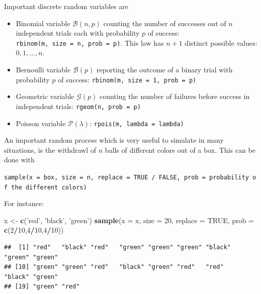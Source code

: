 \documentclass[]{book}
\newenvironment{Shaded}{\begin{snugshade}}{\end{snugshade}}
\newcommand{\DataTypeTok}[1]{\textcolor[rgb]{0.13,0.29,0.53}{#1}}
\newcommand{\DecValTok}[1]{\textcolor[rgb]{0.00,0.00,0.81}{#1}}
\newcommand{\KeywordTok}[1]{\textcolor[rgb]{0.13,0.29,0.53}{\textbf{#1}}}
\newcommand{\NormalTok}[1]{#1}
\newcommand{\OperatorTok}[1]{\textcolor[rgb]{0.81,0.36,0.00}{\textbf{#1}}}
\newcommand{\OtherTok}[1]{\textcolor[rgb]{0.56,0.35,0.01}{#1}}
\newcommand{\StringTok}[1]{\textcolor[rgb]{0.31,0.60,0.02}{#1}}
\providecommand{\tightlist}{%
  \setlength{\itemsep}{0pt}\setlength{\parskip}{0pt}}
\begin{document}
Important discrete random variables are

\begin{itemize}
\tightlist
\item
  Binomial variable \(\mathcal{B}(n, p)\) counting the number of successes out of \(n\) independent trials each with probability \(p\) of success: \texttt{rbinom(m,\ size\ =\ n,\ prob\ =\ p)}. This law has \(n + 1\) distinct possible values: \(0,1,\ldots, n\).
\item
  Bernoulli variable \(\mathcal{B}(p)\) reporting the outcome of a binary trial with probability \(p\) of success: \texttt{rbinom(m,\ size\ =\ 1,\ prob\ =\ p)}
\item
  Geometric variable \(\mathcal{G}(p)\) counting the number of failures before success in independent trials: \texttt{rgeom(n,\ prob\ =\ p)}
\item
  Poisson variable \(\mathcal{P}(\lambda)\): \texttt{rpois(m,\ lambda\ =\ lambda)}
\end{itemize}

An important random process which is very useful to simulate in many situations, is the withdrawl of \(n\) balls of different colors out of a box. This can be done with

\texttt{sample(x\ =\ box,\ size\ =\ n,\ replace\ =\ TRUE\ /\ FALSE,\ prob\ =\ probability\ of\ the\ different\ colors)}

For instance:

\begin{Shaded}
\begin{Highlighting}[]
\NormalTok{x <-}\StringTok{ }\KeywordTok{c}\NormalTok{(}\StringTok{'red'}\NormalTok{, }\StringTok{'black'}\NormalTok{, }\StringTok{'green'}\NormalTok{)}
\KeywordTok{sample}\NormalTok{(}\DataTypeTok{x =}\NormalTok{ x, }\DataTypeTok{size =} \DecValTok{20}\NormalTok{, }\DataTypeTok{replace =} \OtherTok{TRUE}\NormalTok{, }\DataTypeTok{prob =} \KeywordTok{c}\NormalTok{(}\DecValTok{2}\OperatorTok{/}\DecValTok{10}\NormalTok{,}\DecValTok{4}\OperatorTok{/}\DecValTok{10}\NormalTok{,}\DecValTok{4}\OperatorTok{/}\DecValTok{10}\NormalTok{))}
\end{Highlighting}
\end{Shaded}

\begin{verbatim}
##  [1] "red"   "black" "red"   "green" "green" "green" "black" "green" "green"
## [10] "green" "green" "red"   "black" "green" "red"   "red"   "black" "green"
## [19] "green" "red"
\end{verbatim}
\end{document}
